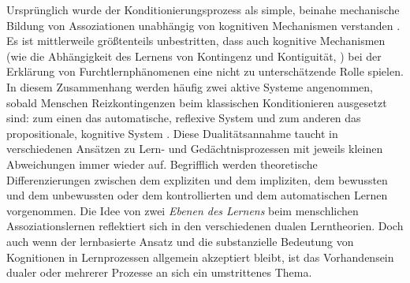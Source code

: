		Ursprünglich wurde der Konditionierungsprozess als simple, beinahe mechanische Bildung von Assoziationen unabhängig von kognitiven Mechanismen verstanden \parencite{LOVIBOND2006}. Es ist mittlerweile größtenteils unbestritten, dass auch kognitive Mechanismen (wie die Abhängigkeit des Lernens von Kontingenz und Kontiguität, ) bei der Erklärung von Furchtlernphänomenen eine nicht zu unterschätzende Rolle spielen. In diesem Zusammenhang werden häufig zwei aktive Systeme angenommen, sobald Menschen Reizkontingenzen beim klassischen Konditionieren ausgesetzt sind: zum einen das automatische, reflexive System und zum anderen das propositionale, kognitive System \parencite{LOVIBOND2006}. Diese Dualitätsannahme taucht in verschiedenen Ansätzen zu Lern- und Gedächtnisprozessen mit jeweils kleinen Abweichungen immer wieder auf. Begrifflich werden theoretische Differenzierungen zwischen dem expliziten und dem impliziten, dem bewussten und dem unbewussten oder dem kontrollierten und dem automatischen Lernen vorgenommen. Die Idee von zwei \textit{Ebenen des Lernens} beim menschlichen Assoziationslernen reflektiert sich in den verschiedenen dualen Lerntheorien. Doch auch wenn der lernbasierte Ansatz und die substanzielle Bedeutung von Kognitionen in Lernprozessen allgemein akzeptiert bleibt, ist das Vorhandensein dualer oder mehrerer Prozesse an sich ein umstrittenes Thema.

